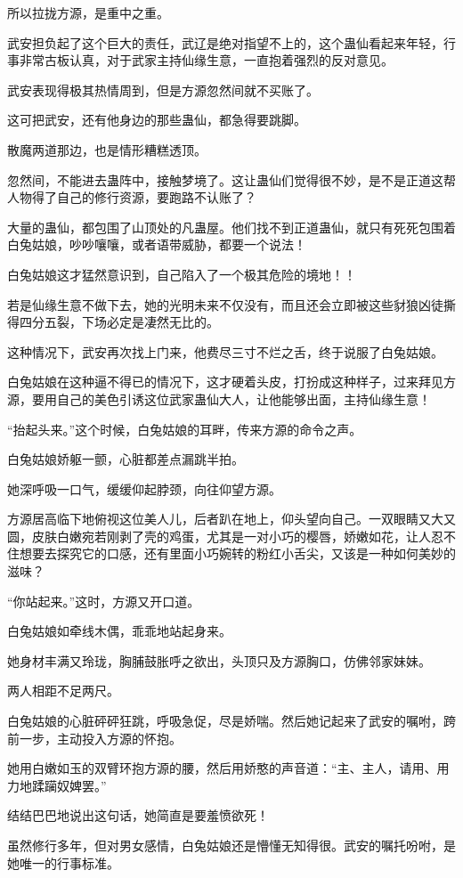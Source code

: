 \begin{this_body}
所以拉拢方源，是重中之重。

武安担负起了这个巨大的责任，武辽是绝对指望不上的，这个蛊仙看起来年轻，行事非常古板认真，对于武家主持仙缘生意，一直抱着强烈的反对意见。

武安表现得极其热情周到，但是方源忽然间就不买账了。

这可把武安，还有他身边的那些蛊仙，都急得要跳脚。

散魔两道那边，也是情形糟糕透顶。

忽然间，不能进去蛊阵中，接触梦境了。这让蛊仙们觉得很不妙，是不是正道这帮人物得了自己的修行资源，要跑路不认账了？

大量的蛊仙，都包围了山顶处的凡蛊屋。他们找不到正道蛊仙，就只有死死包围着白兔姑娘，吵吵嚷嚷，或者语带威胁，都要一个说法！

白兔姑娘这才猛然意识到，自己陷入了一个极其危险的境地！！

若是仙缘生意不做下去，她的光明未来不仅没有，而且还会立即被这些豺狼凶徒撕得四分五裂，下场必定是凄然无比的。

这种情况下，武安再次找上门来，他费尽三寸不烂之舌，终于说服了白兔姑娘。

白兔姑娘在这种逼不得已的情况下，这才硬着头皮，打扮成这种样子，过来拜见方源，要用自己的美色引诱这位武家蛊仙大人，让他能够出面，主持仙缘生意！

“抬起头来。”这个时候，白兔姑娘的耳畔，传来方源的命令之声。

白兔姑娘娇躯一颤，心脏都差点漏跳半拍。

她深呼吸一口气，缓缓仰起脖颈，向往仰望方源。

方源居高临下地俯视这位美人儿，后者趴在地上，仰头望向自己。一双眼睛又大又圆，皮肤白嫩宛若刚剥了壳的鸡蛋，尤其是一对小巧的樱唇，娇嫩如花，让人忍不住想要去探究它的口感，还有里面小巧婉转的粉红小舌尖，又该是一种如何美妙的滋味？

“你站起来。”这时，方源又开口道。

白兔姑娘如牵线木偶，乖乖地站起身来。

她身材丰满又玲珑，胸脯鼓胀呼之欲出，头顶只及方源胸口，仿佛邻家妹妹。

两人相距不足两尺。

白兔姑娘的心脏砰砰狂跳，呼吸急促，尽是娇喘。然后她记起来了武安的嘱咐，跨前一步，主动投入方源的怀抱。

她用白嫩如玉的双臂环抱方源的腰，然后用娇憨的声音道：“主、主人，请用、用力地蹂躏奴婢罢。”

结结巴巴地说出这句话，她简直是要羞愤欲死！

虽然修行多年，但对男女感情，白兔姑娘还是懵懂无知得很。武安的嘱托吩咐，是她唯一的行事标准。


\end{this_body}
